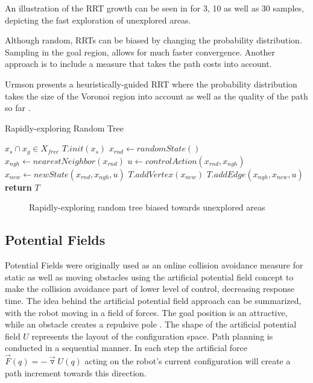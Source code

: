 An illustration of the RRT growth can be seen in  for 3, 10 as well as 30 samples, depicting the fast exploration of unexplored areas.

Although random, RRTs can be biased by changing the probability distribution. Sampling in the goal region, allows for much faster convergence. Another approach is to include a measure that takes the path costs into account. \cite{Lavalle.1999}

Urmson presents a heuristically-guided RRT where the probability distribution takes the size of the Voronoi region into account as well as the quality of the path so far \cite{Urmson.2003}.

\begin{algorithm}
    \caption{Rapidly-exploring Random Tree}\label{alg:RRT}
    \begin{algorithmic}[1]
        \Require $x_s \cap x_g \in X_{free}$
        \State $T.init(x_s)$
            \State $x_{rnd} \gets randomState()$ \label{alg:RRTrandomState}
            \State $x_{ngh} \gets nearestNeighbor(x_{rnd})$ \label{alg:RRTnearestNeighbor}
            \State $u \gets controlAction(x_{rnd}, x_{ngh})$ \label{alg:RRTcontrolAction}
            \State $x_{new} \gets newState(x_{rnd}, x_{ngh}, u)$ \label{alg:RRTnewState}
            \State $T.addVertex(x_{new})$ \label{alg:RRTaddVertex}
            \State $T.addEdge(x_{ngh}, x_{new}, u)$ \label{alg:RRTaddEdge}
        \EndWhile
        \State \textbf{return} $T$
    \end{algorithmic}
\end{algorithm}

\begin{figure}[h]
    \caption{Rapidly-exploring random tree biased towards unexplored areas}
    \label{fig:RRT}
\end{figure}

\subsection{Potential Fields}
Potential Fields were originally used as an online collision avoidance measure for static as well as moving obstacles using the artificial potential field concept to make the collision avoidance part of lower level of control, decreasing response time. The idea behind the artificial potential field approach can be summarized, with the robot moving in a field of forces. The goal position is an attractive, while an obstacle creates a repulsive pole \cite{Khatib.1986}. The shape of the artificial potential field $U$ represents the layout of the configuration space. Path planning is conducted in a sequential manner. In each step the artificial force $\vec{F}(q) = -\vec{\triangledown}U(q)$ acting on the robot's current configuration will create a path increment towards this direction. \cite{Latombe.1991}

